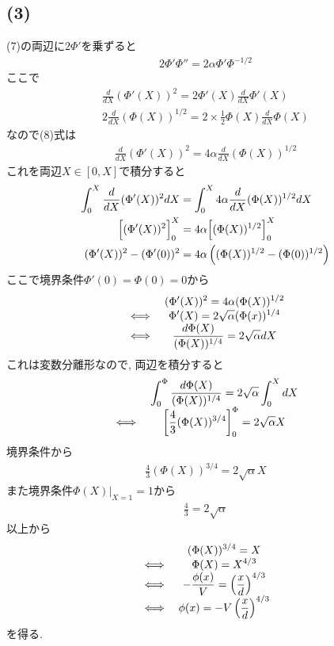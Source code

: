 \documentclass[uplatex,a4j,11pt,dvipdfmx]{jsarticle}
\begin{document}
\subsection*{(3)}
(7)の両辺に$2\Phi'$を乗ずると
\begin{align}
  2\Phi'\Phi''=2\alpha\Phi'\Phi^{-1/2}
\end{align}
ここで
\begin{align}
  \frac{d}{dX}(\Phi'(X))^2=2\Phi'(X)\frac{d}{dX}\Phi'(X)\\
  2\frac{d}{dX}(\Phi(X))^{1/2}=2\times\frac{1}{2}\Phi(X)\frac{d}{dX}\Phi(X)
\end{align}
なので(8)式は
\begin{align}
  \frac{d}{dX}(\Phi'(X))^2=4\alpha\frac{d}{dX}(\Phi(X))^{1/2}
\end{align}
これを両辺$X\in[0,X]$で積分すると
\begin{align}
  \begin{split}
    \int_{0}^{X}\frac{d}{dX}(\Phi'(X))^2dX&=\int_{0}^{X}4\alpha\frac{d}{dX}(\Phi(X))^{1/2}dX\\
    \Bigl[(\Phi'(X))^2\Bigr]_0^X&=4\alpha\Bigl[(\Phi(X))^{1/2}\Bigr]_0^X\\
    (\Phi'(X))^2-(\Phi'(0))^2&=4\alpha\left((\Phi(X))^{1/2}-(\Phi(0))^{1/2}\right)
  \end{split}
\end{align}
ここで境界条件$\Phi'(0)=\Phi(0)=0$から
\begin{align}
  \everymath{\displaystyle}
  \begin{array}{cc}
    &(\Phi'(X))^2=4\alpha(\Phi(X))^{1/2}\\
    \iff&\Phi'(X)=2\sqrt{\alpha}(\Phi(x))^{1/4}\\
    \iff&\frac{d\Phi(X)}{(\Phi(X))^{1/4}}=2\sqrt{\alpha}dX
  \end{array}
\end{align}
これは変数分離形なので, 両辺を積分すると
\begin{align}
  \everymath{\displaystyle}
  \begin{array}{cc}
    &\int_{0}^{\Phi}\frac{d\Phi(X)}{(\Phi(X))^{1/4}}=2\sqrt{\alpha}\int_{0}^{X}dX\\
    \iff&\left[\frac{4}{3}(\Phi(X))^{3/4}\right]_0^\Phi=2\sqrt{\alpha}X
  \end{array}
\end{align}
境界条件から
\begin{align}
  \frac{4}{3}(\Phi(X))^{3/4}=2\sqrt{\alpha}X
\end{align}
また境界条件$\Phi(X)|_{X=1}=1$から
\begin{align}
  \frac{4}{3}=2\sqrt{\alpha}
\end{align}
以上から
\begin{align}
  \everymath{\displaystyle}
  \begin{array}{cc}
    &(\Phi(X))^{3/4}=X\\
    \iff&\Phi(X)=X^{4/3}\\
    \iff&-\frac{\phi(x)}{V}=\left(\frac{x}{d}\right)^{4/3}\\
    \iff&\phi(x)=-V\left(\frac{x}{d}\right)^{4/3}
  \end{array}
\end{align}
を得る.
\end{document}
